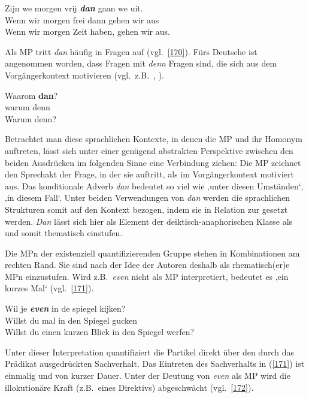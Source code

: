 \begin{exe}
	\ex\label{169} 
	\gll Zijn we morgen vrij \textbf{\textit{dan}} gaan we uit.\\
	Wenn wir morgen frei dann gehen wir aus\\
    \glt Wenn wir morgen Zeit haben, gehen wir aus. 
\newline
\hbox{}\hfill\hbox{\citet[50]{Vriendt1991}}
\end{exe}
Als MP tritt \textit{dan} häufig in Fragen auf (vgl.\ \ref{170}). Fürs Deutsche ist angenommen worden, dass Fragen mit \textit{denn} Fragen sind, die sich aus dem Vorgängerkontext motivieren (vgl.\ z.B.\ \citealt[164, 166]{Thurmair1989}, \citealt[420]{Diewald2006}). 

\begin{exe}
	\ex\label{170} 
	\gll Waarom \textbf{dan}?\\
	 warum   denn \\
    \glt Warum denn?
\hfill\hbox{\citet[50]{Vriendt1991}}
\end{exe}
Betrachtet man diese sprachlichen Kontexte, in denen die MP und ihr Homonym auftreten, lässt sich unter einer genügend abstrakten Perspektive zwischen den beiden Ausdrücken im folgenden Sinne eine Verbindung ziehen: Die MP zeichnet den Sprechakt der Frage, in der sie auftritt, als im Vorgängerkontext motiviert aus. Das konditionale Adverb \textit{dan} bedeutet so viel wie ‚unter diesen Umständen‘, ‚in diesem Fall‘. Unter beiden Verwendungen von \textit{dan} werden die sprachlichen Strukturen somit auf den Kontext bezogen, indem sie in Relation zur  gesetzt werden. \textit{Dan} lässt sich hier als Element der deiktisch-anaphorischen Klasse  als    und somit thematisch einstufen.

Die MPn der existenziell quantifizierenden Gruppe  stehen in Kombinationen am rechten Rand. Sie sind nach der Idee der Autoren deshalb als rhematisch(er)e MPn einzustufen. Wird z.B.\ \textit{even} nicht als MP interpretiert, bedeutet es  ‚ein kurzes Mal‘ (vgl.\ \ref{171}).

\begin{exe}
	\ex\label{171} 
	\gll Wil je \textbf{\textit{even}} in de spiegel kijken?\\
	 Willst du mal in den Spiegel gucken\\
    \glt Willst du einen kurzen Blick in den Spiegel werfen?
\newline
\hbox{}\hfill\hbox{\citet[53]{Vriendt1991}}
\end{exe}
Unter dieser Interpretation quantifiziert die Partikel direkt über den durch das Prädikat ausgedrückten Sachverhalt. Das Eintreten des Sachverhalts in (\ref{171}) ist einmalig und von kurzer Dauer. Unter der Deutung von \textit{even} als MP wird die illokutionäre Kraft (z.B.\ eines Direktivs) abgeschwächt (vgl.\ \ref{172}). 

